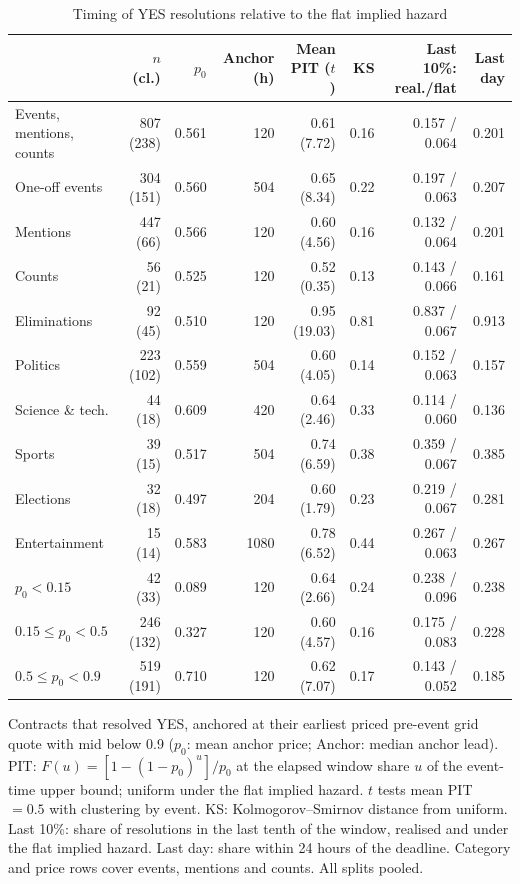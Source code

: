 \begin{table}[ht]
\centering
\begin{threeparttable}
\caption{Timing of YES resolutions relative to the flat implied hazard}\label{haz-tab-timing}
\footnotesize
\setlength{\tabcolsep}{4pt}
\begin{tabular}{@{}lrrrrrrr@{}}
\toprule
 & $n$ (cl.) & $p_0$ & Anchor (h) & Mean PIT ($t$) & KS & Last 10\%: real./flat & Last day \\
\midrule
Events, mentions, counts & 807 (238) & 0.561 & 120 & 0.61 (7.72) & 0.16 & 0.157 / 0.064 & 0.201 \\
\addlinespace
One-off events  & 304 (151) & 0.560 & 504 & 0.65 (8.34)  & 0.22 & 0.197 / 0.063 & 0.207 \\
Mentions        & 447 (66)  & 0.566 & 120 & 0.60 (4.56)  & 0.16 & 0.132 / 0.064 & 0.201 \\
Counts          &  56 (21)  & 0.525 & 120 & 0.52 (0.35)  & 0.13 & 0.143 / 0.066 & 0.161 \\
Eliminations    &  92 (45)  & 0.510 & 120 & 0.95 (19.03) & 0.81 & 0.837 / 0.067 & 0.913 \\
\addlinespace
Politics        & 223 (102) & 0.559 & 504 & 0.60 (4.05)  & 0.14 & 0.152 / 0.063 & 0.157 \\
Science \& tech. &  44 (18) & 0.609 & 420 & 0.64 (2.46)  & 0.33 & 0.114 / 0.060 & 0.136 \\
Sports          &  39 (15)  & 0.517 & 504 & 0.74 (6.59)  & 0.38 & 0.359 / 0.067 & 0.385 \\
Elections       &  32 (18)  & 0.497 & 204 & 0.60 (1.79)  & 0.23 & 0.219 / 0.067 & 0.281 \\
Entertainment   &  15 (14)  & 0.583 & 1080 & 0.78 (6.52) & 0.44 & 0.267 / 0.063 & 0.267 \\
\addlinespace
$p_0<0.15$      &  42 (33)  & 0.089 & 120 & 0.64 (2.66)  & 0.24 & 0.238 / 0.096 & 0.238 \\
$0.15\le p_0<0.5$ & 246 (132) & 0.327 & 120 & 0.60 (4.57) & 0.16 & 0.175 / 0.083 & 0.228 \\
$0.5\le p_0<0.9$  & 519 (191) & 0.710 & 120 & 0.62 (7.07) & 0.17 & 0.143 / 0.052 & 0.185 \\
\bottomrule
\end{tabular}
\begin{tablenotes}\footnotesize
\item Contracts that resolved YES, anchored at their earliest priced pre-event grid quote with mid
below 0.9 ($p_0$: mean anchor price; Anchor: median anchor lead). PIT: $F(u)=[1-(1-p_0)^u]/p_0$ at
the elapsed window share $u$ of the event-time upper bound; uniform under the flat implied hazard.
$t$ tests mean PIT $=0.5$ with clustering by event. KS: Kolmogorov--Smirnov distance from uniform.
Last 10\%: share of resolutions in the last tenth of the window, realised and under the flat implied
hazard. Last day: share within 24 hours of the deadline. Category and price rows cover events,
mentions and counts. All splits pooled.
\end{tablenotes}
\end{threeparttable}
\end{table}

